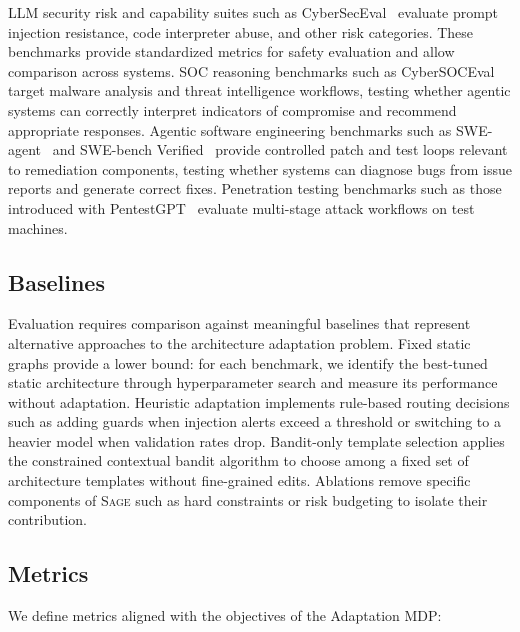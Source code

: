 \documentclass[sigconf,anonymous]{acmart}
\newcommand{\SAGE}{\textsc{Sage}\xspace}
\begin{document}
LLM security risk and capability suites such as CyberSecEval~\cite{bhatt2024cyberseceval2,meta2024cyberseceval3} evaluate prompt injection resistance, code interpreter abuse, and other risk categories. These benchmarks provide standardized metrics for safety evaluation and allow comparison across systems. SOC reasoning benchmarks such as CyberSOCEval~\cite{orlando2024cybersoceval} target malware analysis and threat intelligence workflows, testing whether agentic systems can correctly interpret indicators of compromise and recommend appropriate responses. Agentic software engineering benchmarks such as SWE-agent~\cite{yang2024sweagent} and SWE-bench Verified~\cite{openai2024swebenchverified} provide controlled patch and test loops relevant to remediation components, testing whether systems can diagnose bugs from issue reports and generate correct fixes. Penetration testing benchmarks such as those introduced with PentestGPT~\cite{deng2024pentestgpt} evaluate multi-stage attack workflows on test machines.

\subsection{Baselines}

Evaluation requires comparison against meaningful baselines that represent alternative approaches to the architecture adaptation problem. Fixed static graphs provide a lower bound: for each benchmark, we identify the best-tuned static architecture through hyperparameter search and measure its performance without adaptation. Heuristic adaptation implements rule-based routing decisions such as adding guards when injection alerts exceed a threshold or switching to a heavier model when validation rates drop. Bandit-only template selection applies the constrained contextual bandit algorithm to choose among a fixed set of architecture templates without fine-grained edits. Ablations remove specific components of \SAGE such as hard constraints or risk budgeting to isolate their contribution.

\subsection{Metrics}

We define metrics aligned with the objectives of the Adaptation MDP:
\end{document}
